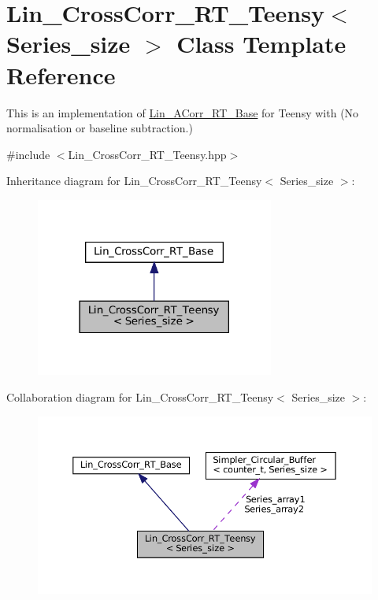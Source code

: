 \hypertarget{classLin__CrossCorr__RT__Teensy}{}\section{Lin\+\_\+\+Cross\+Corr\+\_\+\+R\+T\+\_\+\+Teensy$<$ Series\+\_\+size $>$ Class Template Reference}
\label{classLin__CrossCorr__RT__Teensy}


This is an implementation of \hyperlink{classLin__ACorr__RT__Base}{Lin\+\_\+\+A\+Corr\+\_\+\+R\+T\+\_\+\+Base} for Teensy with {\bfseries }(No normalisation or baseline subtraction.)  




{\ttfamily \#include $<$Lin\+\_\+\+Cross\+Corr\+\_\+\+R\+T\+\_\+\+Teensy.\+hpp$>$}



Inheritance diagram for Lin\+\_\+\+Cross\+Corr\+\_\+\+R\+T\+\_\+\+Teensy$<$ Series\+\_\+size $>$\+:
\nopagebreak
\begin{figure}[H]
\begin{center}
\leavevmode
\includegraphics[width=222pt]{classLin__CrossCorr__RT__Teensy__inherit__graph}
\end{center}
\end{figure}


Collaboration diagram for Lin\+\_\+\+Cross\+Corr\+\_\+\+R\+T\+\_\+\+Teensy$<$ Series\+\_\+size $>$\+:
\nopagebreak
\begin{figure}[H]
\begin{center}
\leavevmode
\includegraphics[width=350pt]{classLin__CrossCorr__RT__Teensy__coll__graph}
\end{center}
\end{figure}
